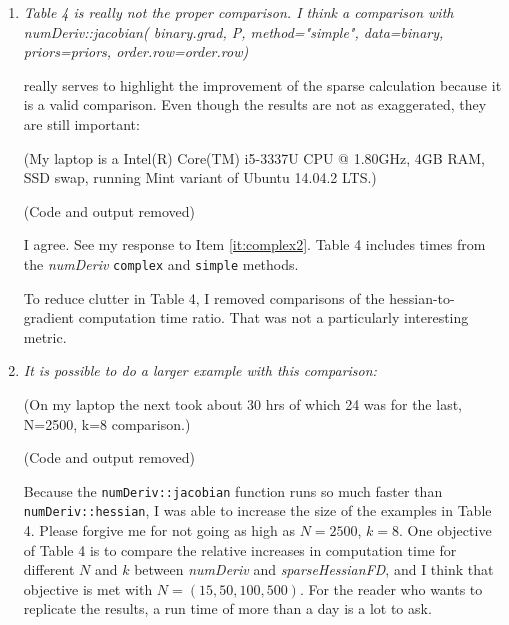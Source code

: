 \documentclass{article}
\newcommand{\pkg}[1]{\emph{#1}}
\newcommand{\code}[1]{\texttt{#1}}
\newcommand{\func}[1]{\code{#1}}
\newcommand{\method}[1]{\func{#1}}
\newenvironment{revQuote}{\itshape}{\vspace{\baselineskip}}
\newenvironment{response}{\normalfont}{\vspace{\baselineskip}}
\begin{document}
\begin{enumerate}[align=left]
\item\begin{revQuote}
Table 4 is really not the proper comparison. I think a comparison with
       numDeriv::jacobian( binary.grad, P, method="simple", 
                   data=binary, priors=priors,
order.row=order.row)

really serves to highlight the improvement of the sparse calculation because
it is a valid comparison. Even though the results are not as exaggerated,
they are still important:

(My laptop is a  Intel(R) Core(TM) i5-3337U CPU @ 1.80GHz,  4GB RAM, SSD
swap, running Mint variant of Ubuntu 14.04.2 LTS.)

(Code and output removed)
  \end{revQuote}
  
  \begin{response}
    I agree.  See my response to Item \ref{it:complex2}.  Table 4
    includes times from the \pkg{numDeriv}
    \method{complex} and \method{simple} methods.

    To reduce clutter in Table 4, I removed comparisons of the
    hessian-to-gradient computation time ratio.  That was not a
    particularly interesting metric.
    
  \end{response}

\item\begin{revQuote}
It is possible to do a larger example with this comparison:

(On my laptop the next took about 30 hrs of which 24 was for the last,
N=2500, k=8 comparison.)

(Code and output removed)

  \end{revQuote}
  
  \begin{response}
Because the \func{numDeriv::jacobian} function runs so much faster
than  \func{numDeriv::hessian}, I was able to increase the size of the
examples in Table 4. Please forgive me for not going as high as
$N=2500$, $k=8$. One objective of Table 4 is to compare the relative
increases in computation time for different $N$ and $k$ between
\pkg{numDeriv} and \pkg{sparseHessianFD}, and I think that objective
is met with $N=(15, 50, 100, 500)$.  For the reader who wants to
replicate the results, a run time of more than a day is a lot to ask.
  \end{response}


\end{enumerate}
\end{document}

